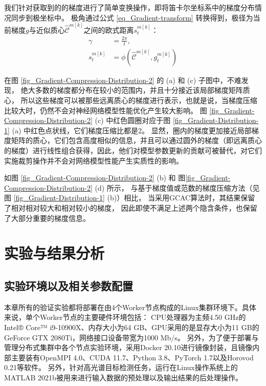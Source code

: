 \documentclass{xdupgthesis}
\begin{document}
我们针对获取到的的梯度进行了简单变换操作，即将笛卡尔坐标系中的梯度分布情况同步到极坐标中。
极角通过公式 \eqref{eq_Gradient-transform} 转换得到，极径为当前梯度$g$与近似质心$\hat{\mathcal{C}}^{m[k]}$之间的欧式距离$s_t^{m[k]}$：
\begin{equation}
    \begin{aligned}
        \gamma &= \frac{2\pi}{t}, \\
        s_t^{m[k]} &= \phi \left(\hat{\mathcal{C}}^{m[k]}, g_{t}^{m[k]} \right)
    \end{aligned}
    \label{eq_Gradient-transform}
\end{equation}

在图 \ref{fig_Gradient-Compression-Distribution-2} 的 (a) 和 (c) 子图中，不难发现，
绝大多数的梯度都分布在较小的范围内，并且十分接近该局部梯度矩阵质心，
所以这些梯度可以被那些远离质心的梯度进行表示，也就是说，当梯度压缩比较大时，仍然不会对神经网络模型性能优化产生较大影响。
图 \ref{fig_Gradient-Compression-Distribution-2} (c) 中红色圆圈对应于图 \ref{fig_Gradient-Distribution-1} (a) 中红色点状线，它们梯度压缩比都是2。
显然，圈内的梯度更加接近局部梯度矩阵的质心，它们包含高度相似的信息，并且可以通过圆外的梯度（即远离质心的梯度）进行线性组合获得，因此，他们对模型参数更新的贡献可被替代，对它们实施裁剪操作并不会对网络模型性能产生实质性的影响。

如图 \ref{fig_Gradient-Compression-Distribution-2} (b) 和 图\ref{fig_Gradient-Compression-Distribution-2} (d) 所示，
与基于梯度值或范数的梯度压缩方法（见图 \ref{fig_Gradient-Distribution-1} (b)）相比，
当采用GCAC算法时，其结果保留了相对相对较大和相对较小的梯度，
因此即使不满足上述两个隐含条件，也保留了大部分重要的梯度信息。

\section{实验与结果分析}
\label{sec_ResultAndAnalisy}
\subsection{实验环境以及相关参数配置}
\label{sec_EnvironmentAndHyperParameterSet}
本章所有的验证实验都将部署在由4个Worker节点构成的Linux集群环境下。具体来说，单个Worker节点的主要硬件环境包括：
CPU处理器为主频4.50 GHz的Intel® Core™ i9-10900X、内存大小为64 GB、GPU采用的是显存大小为11 GB的GeForce GTX 2080Ti，网络接口设备带宽为1000 Mb/s。
另外，为了便于部署与管理分布式集群中各个节点实验环境，采用Docker 20.10进行镜像封装，且镜像内部主要装有OpenMPI 4.0、CUDA 11.7、Python 3.8、PyTorch 1.7以及Horovod 0.21等软件。
另外，针对高光谱目标检测任务，运行在Linux操作系统上的MATLAB 2021b被用来进行输入数据的预处理以及输出结果的后处理操作。
\end{document}
